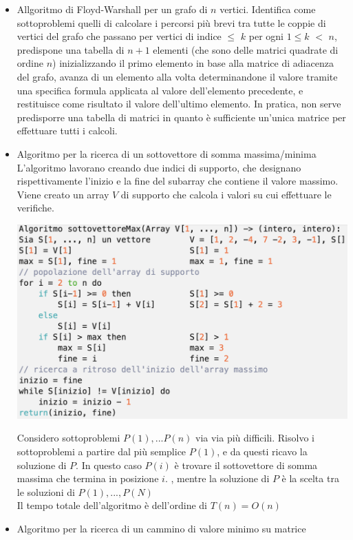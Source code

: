 \documentclass[11pt, oneside]{article}   	%
\begin{document}
\begin{itemize}
\item Allgoritmo di Floyd-Warshall per un grafo di $n$ vertici.
Identifica come sottoproblemi quelli di calcolare i percorsi più brevi tra tutte le coppie di vertici del grafo che passano per vertici di indice $\leq$ $k$ per ogni $1 \leq k$ $<$ $n$, predispone una tabella di $n + 1$ elementi (che sono delle matrici quadrate di ordine $n$) inizializzando il primo elemento in base alla matrice di adiacenza del grafo, avanza di un elemento alla volta determinandone il valore tramite una specifica formula applicata al valore dell’elemento precedente, e restituisce come risultato il valore dell’ultimo elemento. In pratica, non serve predisporre una tabella di matrici in quanto è sufficiente un’unica matrice per effettuare tutti i calcoli.
\item Algoritmo per la ricerca di un sottovettore di somma massima/minima\\
L'algoritmo lavorano creando due indici di supporto, che designano rispettivamente l'inizio e la fine del subarray che contiene il valore massimo. Viene creato un array $V$ di supporto che calcola i valori su cui effettuare le verifiche.
\begin{center}
\includegraphics[scale=0.7]{sottomax}
\end{center}
Considero sottoproblemi $P(1), ... P(n)$ via via più difficili. Risolvo i sottoproblemi a partire dal più semplice $P(1)$, e da questi ricavo la soluzione di $P$. In questo caso $P(i)$ è trovare il sottovettore di somma massima che termina in posizione $i$. , mentre la soluzione di $P$ è la scelta tra le soluzioni di $P(1), ..., P(N)$ \\
Il tempo totale dell'algoritmo è dell'ordine di $T(n) = O(n)$
\item Algoritmo per la ricerca di un cammino di valore minimo su matrice\\

\end{itemize}
\end{document}
